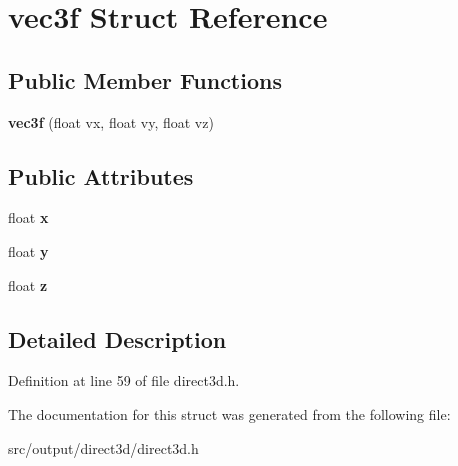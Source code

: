 \hypertarget{structvec3f}{\section{vec3f Struct Reference}
\label{structvec3f}
}
\subsection*{Public Member Functions}
\begin{DoxyCompactItemize}
\item 
\hypertarget{structvec3f_a308cf3b4bb1d3472c9f7e484d04393e0}{{\bfseries vec3f} (float vx, float vy, float vz)}\label{structvec3f_a308cf3b4bb1d3472c9f7e484d04393e0}

\end{DoxyCompactItemize}
\subsection*{Public Attributes}
\begin{DoxyCompactItemize}
\item 
\hypertarget{structvec3f_a1417f8559817da7ea82a53f83f671552}{float {\bfseries x}}\label{structvec3f_a1417f8559817da7ea82a53f83f671552}

\item 
\hypertarget{structvec3f_a9d9bd6e586efc6b2fdba9302e9414099}{float {\bfseries y}}\label{structvec3f_a9d9bd6e586efc6b2fdba9302e9414099}

\item 
\hypertarget{structvec3f_a6294514a5a4322c1c957a1f09972c756}{float {\bfseries z}}\label{structvec3f_a6294514a5a4322c1c957a1f09972c756}

\end{DoxyCompactItemize}


\subsection{Detailed Description}


Definition at line 59 of file direct3d.\-h.



The documentation for this struct was generated from the following file\-:\begin{DoxyCompactItemize}
\item 
src/output/direct3d/direct3d.\-h\end{DoxyCompactItemize}
